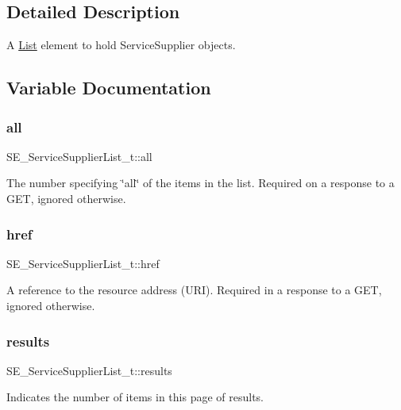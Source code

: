 \subsection{Detailed Description}
A \hyperlink{structList}{List} element to hold Service\+Supplier objects. 

\subsection{Variable Documentation}
\mbox{\label{group__ServiceSupplierList_ga0c0d5b0fd6e9dd514527dc1e7f955d42}} 
\subsubsection{\texorpdfstring{all}{all}}
{\footnotesize\ttfamily S\+E\+\_\+\+Service\+Supplier\+List\+\_\+t\+::all}

The number specifying \char`\"{}all\char`\"{} of the items in the list. Required on a response to a G\+ET, ignored otherwise. \mbox{\label{group__ServiceSupplierList_gacfc612acee8ca5e00775dea00a91b6a6}} 
\subsubsection{\texorpdfstring{href}{href}}
{\footnotesize\ttfamily S\+E\+\_\+\+Service\+Supplier\+List\+\_\+t\+::href}

A reference to the resource address (U\+RI). Required in a response to a G\+ET, ignored otherwise. \mbox{\label{group__ServiceSupplierList_ga4fba3923e5af63d5f73c91930a2c9534}} 
\subsubsection{\texorpdfstring{results}{results}}
{\footnotesize\ttfamily S\+E\+\_\+\+Service\+Supplier\+List\+\_\+t\+::results}

Indicates the number of items in this page of results. 